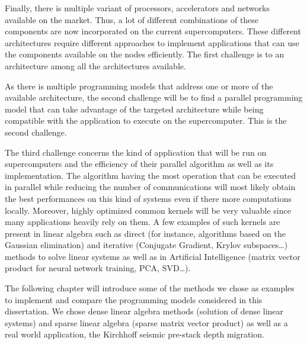 Finally, there is multiple variant of processors, accelerators and networks available on the market.
Thus, a lot of different combinations of these components are now incorporated on the current supercomputers.
These different architectures require different approaches to implement applications that can use the components available on the nodes efficiently.
The first challenge is to an architecture among all the architectures available.

As there is multiple programming models that address one or more of the available architecture, the second challenge will be to find a parallel programming model that can take advantage of the targeted architecture while being compatible with the application to execute on the supercomputer.
This is the second challenge.

The third challenge concerns the kind of application that will be run on supercomputers and the efficiency of their parallel algorithm as well as its implementation.
The algorithm having the most operation that can be executed in parallel while reducing the number of communications will most likely obtain the best performances on this kind of systems even if there more computations locally.
Moreover, highly optimized common kernels will be very valuable since many applications heavily rely on them.
A few examples of such kernels are present in linear algebra such as direct (for instance, algorithms based on the Gaussian elimination) and iterative (Conjugate Gradient, Krylov subspaces\dots) methods to solve linear systems as well as in Artificial Intelligence (matrix vector product for neural network training, PCA, SVD\dots).

The following chapter will introduce some of the methods we chose as examples to implement and compare the programming models considered in this dissertation.
We chose dense linear algebra methods (solution of dense linear systems) and sparse linear algebra (sparse matrix vector product) as well as a real world application, the Kirchhoff seismic pre-stack depth migration.
